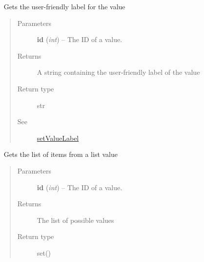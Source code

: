 \documentclass[letterpaper,10pt,english]{sphinxmanual}
\begin{document}
\begin{fulllineitems}
\begin{fulllineitems}
\begin{quote}
\begin{description}
\end{description}\end{quote}

\end{fulllineitems}


\begin{fulllineitems}
\label{libopenzwave:libopenzwave.PyManager.getValueLabel}~\label{libopenzwave:getvaluelabel}
Gets the user-friendly label for the value
\begin{quote}\begin{description}
\item[{Parameters}] \leavevmode
\textbf{id} (\emph{int}) -- The ID of a value.

\item[{Returns}] \leavevmode
A string containing the user-friendly label of the value

\item[{Return type}] \leavevmode
str

\item[{See}] \leavevmode
{\hyperref[libopenzwave:setvaluelabel]{setValueLabel}}

\end{description}\end{quote}

\end{fulllineitems}


\begin{fulllineitems}
\label{libopenzwave:libopenzwave.PyManager.getValueListItems}~\label{libopenzwave:getvaluelistitems}
Gets the list of items from a list value
\begin{quote}\begin{description}
\item[{Parameters}] \leavevmode
\textbf{id} (\emph{int}) -- The ID of a value.

\item[{Returns}] \leavevmode
The list of possible values

\item[{Return type}] \leavevmode
set()


\end{description}
\end{quote}
\end{fulllineitems}
\end{fulllineitems}
\end{document}
